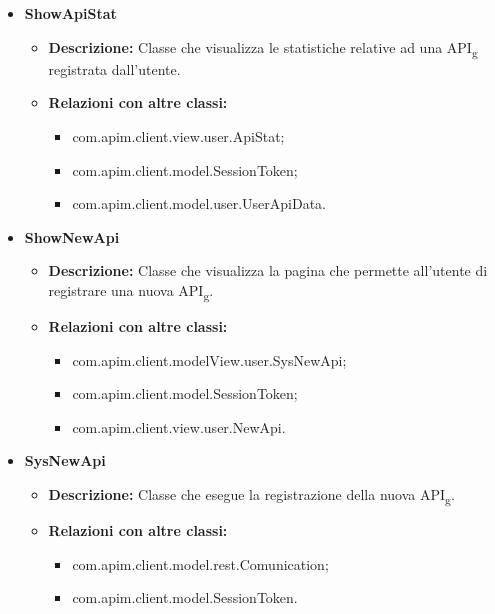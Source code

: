 {{{\begin{itemize}
\begin{itemize}
\begin{itemize}
							\item com.apim.client.model.SessionToken.
						\end{itemize}
					\end{itemize}
				\item \textbf{ShowApiStat}
					\begin{itemize}
						\item \textbf{Descrizione:} Classe che visualizza le statistiche relative ad una API\textsubscript{g} registrata dall'utente.
						\item \textbf{Relazioni con altre classi:}
						\begin{itemize}
							\item com.apim.client.view.user.ApiStat;
							\item com.apim.client.model.SessionToken;
							\item com.apim.client.model.user.UserApiData.
						\end{itemize}
					\end{itemize}
				\item \textbf{ShowNewApi}
					\begin{itemize}
						\item \textbf{Descrizione:} Classe che visualizza la pagina che permette all'utente di registrare una nuova API\textsubscript{g}.
						\item \textbf{Relazioni con altre classi:}
						\begin{itemize}
							\item com.apim.client.modelView.user.SysNewApi;
							\item com.apim.client.model.SessionToken;
							\item com.apim.client.view.user.NewApi.
						\end{itemize}
					\end{itemize}
				\item \textbf{SysNewApi}
					\begin{itemize}
						\item \textbf{Descrizione:} Classe che esegue la registrazione della nuova API\textsubscript{g}.
						\item \textbf{Relazioni con altre classi:}
						\begin{itemize}
							\item com.apim.client.model.rest.Comunication;
							\item com.apim.client.model.SessionToken.
						\end{itemize}
					\end{itemize}

\end{itemize}}}}
